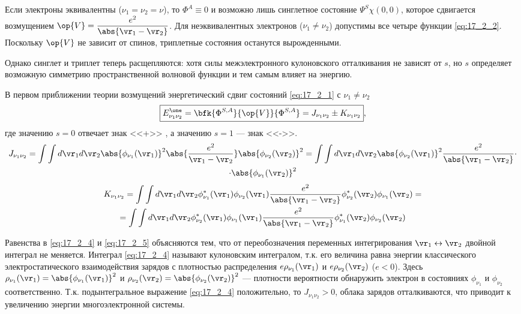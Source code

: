 Если электроны эквивалентны ($\nu_1 = \nu_2= \nu$), то $\Phi^A \equiv 0$ и возможно лишь синглетное состояние $\Psi^S \chi(0, 0)$, которое сдвигается возмущением $\op{V} = \dfrac{e^2}{\abs{\vr_1 - \vr_2}}$. Для неэквивалентных электронов ($\nu_1 \neq \nu_2$) допустимы все четыре функции \eqref{eq:17_2_2}. Поскольку $\op{V}$ не зависит от спинов, триплетные состояния останутся вырожденными.

Однако синглет и триплет теперь расщепляются: хотя силы межэлектронного кулоновского отталкивания не зависят от $s$, но $s$ определяет возможную симметрию пространственной волновой функции и тем самым влияет на энергию.

В первом приближении теории возмущений энергетический сдвиг состояний \eqref{eq:17_2_1} с $\nu_1 \neq \nu_2$
\begin{equation}
\label{eq:17_2_3}
\boxed{E_{\nu_1 \nu_2}^\one = \bfk{\Phi^{S, A}}{\op{V}}{\Phi^{S, A}} = J_{\nu_1 \nu_2} \pm K_{\nu_1 \nu_2}},
\end{equation}
где значению $s = 0$ отвечает знак <<+>> , а значению $s = 1$ --- знак <<->>.
\begin{gather}
\label{eq:17_2_4}
J_{\nu_1 \nu_2} = \int \int d\vr_1 d\vr_2 \abs{\phi_{\nu_1}(\vr_1)}^2 \abs{\frac{e^2}{\vr_1 - \vr_2}} \abs{\phi_{\nu_2}(\vr_2)}^2 = \int \int d\vr_1 d\vr_2 \abs{\phi_{\nu_2}(\vr_1)}^2 \frac{e^2}{\abs{\vr_1 - \vr_2}} \cdot \nonumber \\ \cdot \abs{\phi_{\nu_1}(\vr_2)}^2
\end{gather}
\begin{gather}
\label{eq:17_2_5}
K_{\nu_1 \nu_2} = \int \int d\vr_1 d\vr_2 \phi^*_{\nu_1}(\vr_1) \phi_{\nu_2}(\vr_1)\frac{e^2}{\abs{\vr_1 - \vr_2}}  \phi^*_{\nu_2}(\vr_2) \phi_{\nu_1}(\vr_2) = \nonumber \\
= \int \int d\vr_1 d\vr_2 \phi^*_{\nu_2}(\vr_1) \phi_{\nu_1}(\vr_1)\frac{e^2}{\abs{\vr_1 - \vr_2}}  \phi^*_{\nu_1}(\vr_2) \phi_{\nu_2}(\vr_2)
\end{gather}

Равенства в \eqref{eq:17_2_4} и \eqref{eq:17_2_5} объясняются тем, что от переобозначения переменных интегрирования $\vr_1 \leftrightarrow \vr_2$ двойной интеграл не меняется. Интеграл \eqref{eq:17_2_4} называют кулоновским интегралом, т.к. его величина равна энергии классического электростатического взаимодействия зарядов с плотностью распределения $e\rho_{\nu_1}(\vr_1)$ и $e\rho_{\nu_2}(\vr_2)$ ($e < 0$). Здесь $\rho_{\nu_1}(\vr_1) = \abs{\phi_{\nu_1}(\vr_1)}^2$ и $\rho_{\nu_2}(\vr_2) = \abs{\phi_{\nu_2}(\vr_2)}^2$ --- плотности вероятности обнаружить электрон в состояниях $\phi_{\nu_1}$ и $\phi_{\nu_2}$ соответственно. Т.к. подынтегральное выражение \eqref{eq:17_2_4} положительно, то $J_{\nu_1 \nu_2} > 0$, облака зарядов отталкиваются, что приводит к увеличению энергии многоэлектронной системы.

